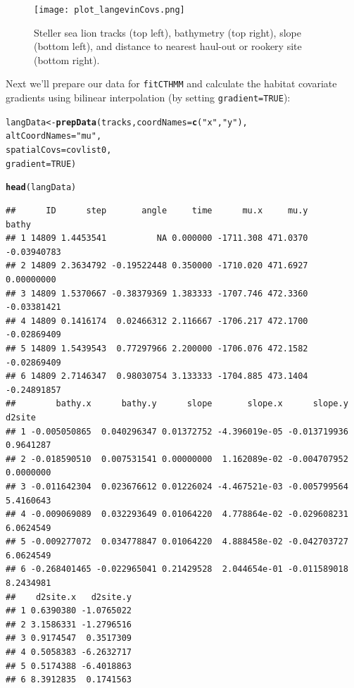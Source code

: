 \documentclass[12pt]{article}\usepackage[]{graphicx}\usepackage[]{xcolor}
\makeatletter
\newcommand{\hlnum}[1]{\textcolor[rgb]{0.686,0.059,0.569}{#1}}%
\newcommand{\hlsng}[1]{\textcolor[rgb]{0.192,0.494,0.8}{#1}}%
\newcommand{\hldef}[1]{\textcolor[rgb]{0.345,0.345,0.345}{#1}}%
\newcommand{\hlkwb}[1]{\textcolor[rgb]{0.69,0.353,0.396}{#1}}%
\newcommand{\hlkwc}[1]{\textcolor[rgb]{0.333,0.667,0.333}{#1}}%
\newcommand{\hlkwd}[1]{\textcolor[rgb]{0.737,0.353,0.396}{\textbf{#1}}}%
\newenvironment{kframe}{%
 \def\at@end@of@kframe{}%
 \ifinner\ifhmode%
  \def\at@end@of@kframe{\end{minipage}}%
  \begin{minipage}{\columnwidth}%
 \fi\fi%
 \def\FrameCommand##1{\hskip\@totalleftmargin \hskip-\fboxsep
 \colorbox{shadecolor}{##1}\hskip-\fboxsep
     \hskip-\linewidth \hskip-\@totalleftmargin \hskip\columnwidth}%
 \MakeFramed {\advance\hsize-\width
   \@totalleftmargin\z@ \linewidth\hsize
   \@setminipage}}%
 {\par\unskip\endMakeFramed%
 \at@end@of@kframe}
\newenvironment{knitrout}{}{} %
\makeatother
\begin{document}
\begin{figure}
\center
\texttt{[image: plot\_langevinCovs.png]}
\caption{Steller sea lion tracks (top left), bathymetry (top right), slope (bottom left), and distance to nearest haul-out or rookery site (bottom right).}
\end{figure}
\noindent Next we'll prepare our data for \verb|fitCTHMM| and calculate the habitat covariate gradients using bilinear interpolation (by setting \verb|gradient=TRUE|):

\begin{knitrout}
\color{fgcolor}\begin{kframe}
\begin{alltt}
\hldef{langData} \hlkwb{<-} \hlkwd{prepData}\hldef{(tracks,}\hlkwc{coordNames} \hldef{=} \hlkwd{c}\hldef{(}\hlsng{"x"}\hldef{,}\hlsng{"y"}\hldef{),}
                      \hlkwc{altCoordNames} \hldef{=} \hlsng{"mu"}\hldef{,}
                      \hlkwc{spatialCovs} \hldef{= covlist0,}
                      \hlkwc{gradient}\hldef{=}\hlnum{TRUE}\hldef{)}
\end{alltt}
\end{kframe}
\end{knitrout}
\begin{knitrout}
\color{fgcolor}\begin{kframe}
\begin{alltt}
\hlkwd{head}\hldef{(langData)}
\end{alltt}
\begin{verbatim}
##      ID      step       angle     time      mu.x     mu.y       bathy
## 1 14809 1.4453541          NA 0.000000 -1711.308 471.0370 -0.03940783
## 2 14809 2.3634792 -0.19522448 0.350000 -1710.020 471.6927  0.00000000
## 3 14809 1.5370667 -0.38379369 1.383333 -1707.746 472.3360 -0.03381421
## 4 14809 0.1416174  0.02466312 2.116667 -1706.217 472.1700 -0.02869409
## 5 14809 1.5439543  0.77297966 2.200000 -1706.076 472.1582 -0.02869409
## 6 14809 2.7146347  0.98030754 3.133333 -1704.885 473.1404 -0.24891857
##        bathy.x      bathy.y      slope       slope.x      slope.y    d2site
## 1 -0.005050865  0.040296347 0.01372752 -4.396019e-05 -0.013719936 0.9641287
## 2 -0.018590510  0.007531541 0.00000000  1.162089e-02 -0.004707952 0.0000000
## 3 -0.011642304  0.023676612 0.01226024 -4.467521e-03 -0.005799564 5.4160643
## 4 -0.009069089  0.032293649 0.01064220  4.778864e-02 -0.029608231 6.0624549
## 5 -0.009277072  0.034778847 0.01064220  4.888458e-02 -0.042703727 6.0624549
## 6 -0.268401465 -0.022965041 0.21429528  2.044654e-01 -0.011589018 8.2434981
##    d2site.x   d2site.y
## 1 0.6390380 -1.0765022
## 2 3.1586331 -1.2796516
## 3 0.9174547  0.3517309
## 4 0.5058383 -6.2632717
## 5 0.5174388 -6.4018863
## 6 8.3912835  0.1741563
\end{verbatim}
\end{kframe}
\end{knitrout}
\end{document}
